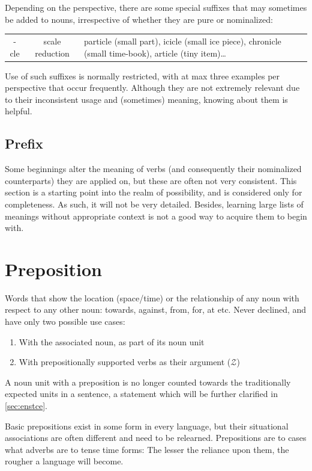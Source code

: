 Depending on the perspective, there are some special suffixes that may sometimes be added to nouns, irrespective of whether they are pure or nominalized:
\begin{example}
    \begin{tabular}{c|c|m{9cm}}
        -cle & scale reduction & particle (small part), icicle (small ice piece), chronicle (small time-book), article (tiny item)\ldots
    \end{tabular}
\end{example}
Use of such suffixes is normally restricted, with at max three examples per perspective that occur frequently. Although they are not extremely relevant due to their inconsistent usage and (sometimes) meaning, knowing about them is helpful.
\subsection{Prefix}
Some beginnings alter the meaning of verbs (and consequently their nominalized counterparts) they are applied on, but these are often not very consistent. This section is a starting point into the realm of possibility, and is considered only for completeness.  As such, it will not be very detailed. Besides, learning large lists of meanings without appropriate context is not a good way to acquire them to begin with.
\section{Preposition} \label{sec:enprep}
Words that show the location (space/time) or the relationship of any noun with respect to any other noun:  towards, against, from, for, at etc.  Never declined, and have only two possible use cases:
\begin{enumerate}
    \item With the associated noun, as part of its noun unit
    \item With prepositionally supported verbs as their argument ($\mathcal{Z}$)
\end{enumerate}
A noun unit with a preposition is no longer counted towards the traditionally expected units in a sentence, a statement which will be further clarified in \autoref{sec:enstce}.

Basic prepositions exist in some form in every language, but their situational associations are often different and need to be relearned. Prepositions are to cases what adverbs are to tense time forms: The lesser the reliance upon them, the rougher a language will become.
